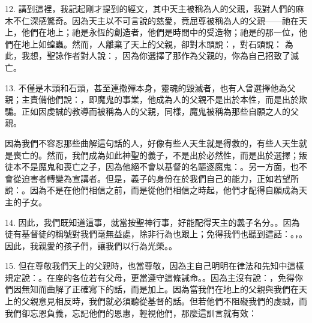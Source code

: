 12. 講到這裡，我記起剛才提到的經文，其中天主被稱為人的父親，我對人們的麻木不仁深感驚奇。因為天主以不可言說的慈愛，竟屈尊被稱為人的父親——祂在天上，他們在地上；祂是永恆的創造者，他們是時間中的受造物；祂是的那一位，他們在地上如蝗蟲。然而，人離棄了天上的父親，卻對木頭說：，對石頭說： 為此，我想，聖詠作者對人說：，因為你選擇了那作為父親的，你為自己招致了滅亡。\par

13. 不僅是木頭和石頭，甚至連撒殫本身，靈魂的毀滅者，也有人曾選擇他為父親；主責備他們說：，即魔鬼的事業，他成為人的父親不是出於本性，而是出於欺騙。正如因虔誠的教導而被稱為人的父親，同樣，魔鬼被稱為那些自願之人的父親。\par

因為我們不容忍那些曲解這句話的人，好像有些人天生就是得救的，有些人天生就是喪亡的。然而，我們成為如此神聖的義子，不是出於必然性，而是出於選擇；叛徒本不是魔鬼和喪亡之子，因為他絕不會以基督的名驅逐魔鬼：。另一方面，也不會從迫害者轉變為宣講者。但是，義子的身份在於我們自己的能力，正如若望所說：。因為不是在他們相信之前，而是從他們相信之時起，他們才配得自願成為天主的子女。\par

14. 因此，我們既知道這事，就當按聖神行事，好能配得天主的義子名分。。因為徒有基督徒的稱號對我們毫無益處，除非行為也跟上；免得我們也聽到這話：。，。因此，我親愛的孩子們，讓我們以行為光榮。。\par

15. 但在尊敬我們天上的父親時，也當尊敬，因為主自己明明在律法和先知中這樣規定說：。在座的各位若有父母，更當遵守這條誡命。。因為主沒有說：，免得你們因無知而曲解了正確寫下的話，而是加上。因為當我們在地上的父親與我們在天上的父親意見相反時，我們就必須聽從基督的話。但若他們不阻礙我們的虔誠，而我們卻忘恩負義，忘記他們的恩惠，輕視他們，那麼這訓言就有效：\par

